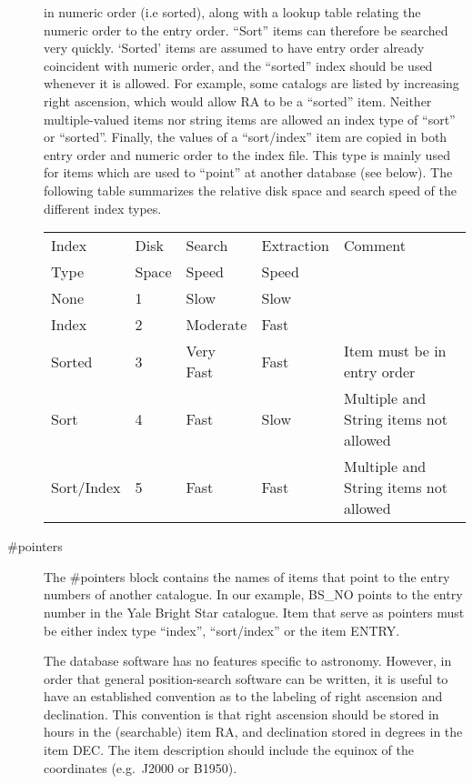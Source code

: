 \begin{description}
in numeric order (i.e sorted), along with a lookup table relating 
the numeric order to the entry order.  ``Sort'' items can therefore be
searched very quickly.  `Sorted' items are assumed to have entry order
already coincident with numeric order, and the ``sorted'' index should be
used whenever it is allowed. For example, some catalogs are
listed by increasing right ascension, which would allow RA to be a
``sorted'' item.  Neither multiple-valued items nor string items are allowed 
an index type of ``sort'' or
``sorted''.  Finally, the values of a ``sort/index'' item are copied in both
entry order and numeric order to the index file.  This type is mainly used
for items which are used to ``point'' at another database (see below).
The following table summarizes the relative disk space and search
speed of the different index types. 
\vspace{0.1in}
\begin{tabular}{|l|l|l|l|l|} \hline
Index  & Disk  & Search & Extraction & Comment \\ 
Type & Space  & Speed & Speed & \\ \hline\hline
None & 1 &  Slow & Slow & \\ \hline
Index & 2 & Moderate & Fast & \\ \hline
Sorted & 3 & Very Fast & Fast & Item must be in entry order \\ \hline 
Sort & 4 & Fast & Slow & Multiple and String items not allowed \\   \hline
Sort/Index & 5 & Fast & Fast & Multiple and String items not allowed \\ \hline
\end{tabular}
\vspace{0.1in}
\item [\#pointers] The \#pointers block contains the names of items
that point to the entry numbers of another catalogue.  In our example,
BS\_NO points to the entry number in the Yale Bright Star catalogue.
Item that serve as pointers must be either index type ``index'',
``sort/index'' or the item ENTRY.

The database software has no features specific to astronomy.    However,
in order that general position-search software can be written, it is useful
to have an established convention as to the labeling of right ascension and
declination.   This convention is that right ascension should be
stored in hours in the (searchable) item RA, and declination stored in
degrees in the item DEC.     The item description should include the 
equinox of the coordinates (e.g.\ J2000 or B1950).
 
\end{description}

